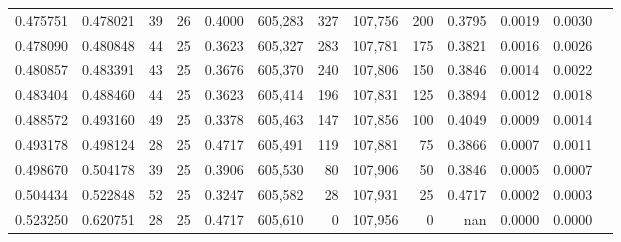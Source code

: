 \begin{tabular}{rrrrrrrrrrrrr}
0.475751 & 0.478021 &    39 &  26 &                                     0.4000 & 605,283 &     327 & 107,756 &     200 & 0.3795 & 0.0019 & 0.0030 \\
0.478090 & 0.480848 &    44 &  25 &                                     0.3623 & 605,327 &     283 & 107,781 &     175 & 0.3821 & 0.0016 & 0.0026 \\
0.480857 & 0.483391 &    43 &  25 &                                     0.3676 & 605,370 &     240 & 107,806 &     150 & 0.3846 & 0.0014 & 0.0022 \\
0.483404 & 0.488460 &    44 &  25 &                                     0.3623 & 605,414 &     196 & 107,831 &     125 & 0.3894 & 0.0012 & 0.0018 \\
0.488572 & 0.493160 &    49 &  25 &                                     0.3378 & 605,463 &     147 & 107,856 &     100 & 0.4049 & 0.0009 & 0.0014 \\
0.493178 & 0.498124 &    28 &  25 &                                     0.4717 & 605,491 &     119 & 107,881 &      75 & 0.3866 & 0.0007 & 0.0011 \\
0.498670 & 0.504178 &    39 &  25 &                                     0.3906 & 605,530 &      80 & 107,906 &      50 & 0.3846 & 0.0005 & 0.0007 \\
0.504434 & 0.522848 &    52 &  25 &                                     0.3247 & 605,582 &      28 & 107,931 &      25 & 0.4717 & 0.0002 & 0.0003 \\
0.523250 & 0.620751 &    28 &  25 &                                     0.4717 & 605,610 &       0 & 107,956 &       0 &    nan & 0.0000 & 0.0000 \\
\bottomrule
\end{tabular}
